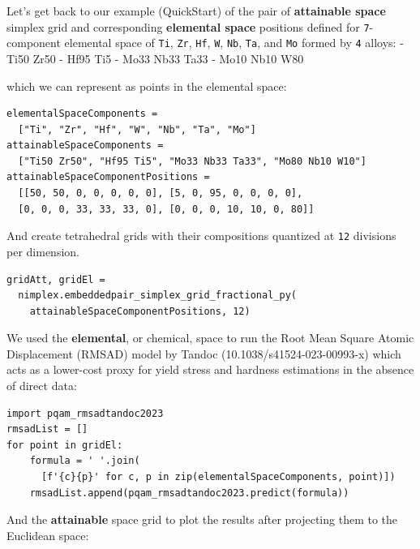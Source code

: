Let's get back to our example (QuickStart) of the pair of
\textbf{attainable space} simplex grid and corresponding
\textbf{elemental space} positions defined for
\texttt{7}-component elemental space of
\texttt{Ti}, \texttt{Zr},
\texttt{Hf}, \texttt{W},
\texttt{Nb}, \texttt{Ta}, and
\texttt{Mo} formed by \texttt{4}
alloys: - Ti50 Zr50 - Hf95 Ti5 - Mo33 Nb33 Ta33 - Mo10 Nb10 W80

which we can represent as points in the elemental space:

\begin{verbatim}
elementalSpaceComponents = 
  ["Ti", "Zr", "Hf", "W", "Nb", "Ta", "Mo"]
attainableSpaceComponents = 
  ["Ti50 Zr50", "Hf95 Ti5", "Mo33 Nb33 Ta33", "Mo80 Nb10 W10"]
attainableSpaceComponentPositions = 
  [[50, 50, 0, 0, 0, 0, 0], [5, 0, 95, 0, 0, 0, 0], 
  [0, 0, 0, 33, 33, 33, 0], [0, 0, 0, 10, 10, 0, 80]]
\end{verbatim}

And create tetrahedral grids with their compositions quantized at
\texttt{12} divisions per dimension.

\begin{verbatim}
gridAtt, gridEl =
  nimplex.embeddedpair_simplex_grid_fractional_py(
    attainableSpaceComponentPositions, 12)
\end{verbatim}

We used the \textbf{elemental}, or chemical, space to run the Root Mean
Square Atomic Displacement (RMSAD) model by Tandoc
(10.1038/s41524-023-00993-x) which acts as a lower-cost proxy for yield
stress and hardness estimations in the absence of direct data:

\begin{verbatim}
import pqam_rmsadtandoc2023
rmsadList = []
for point in gridEl:
    formula = ' '.join(
      [f'{c}{p}' for c, p in zip(elementalSpaceComponents, point)])
    rmsadList.append(pqam_rmsadtandoc2023.predict(formula))
\end{verbatim}

And the \textbf{attainable} space grid to plot the results after
projecting them to the Euclidean space:

